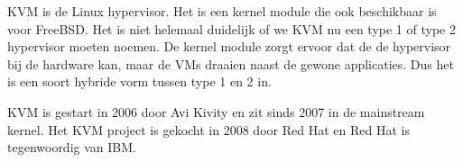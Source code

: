 KVM is de Linux hypervisor. Het is een kernel module die ook beschikbaar is voor FreeBSD. Het is niet helemaal duidelijk of we KVM nu een type 1 of type 2 hypervisor moeten noemen. De kernel module zorgt ervoor dat de de hypervisor bij de hardware kan, maar de VMs draaien naast de gewone applicaties. Dus het is een soort hybride vorm tussen type 1 en 2 in.

KVM is gestart in 2006 door Avi Kivity en zit sinds 2007 in de mainstream kernel. Het KVM project is gekocht in 2008 door Red Hat en Red Hat is tegenwoordig van IBM.


